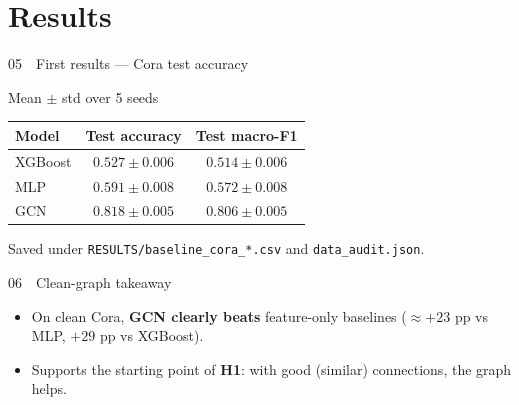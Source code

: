 \documentclass[
  english,
  aspectratio=169,
]{beamer}
\begin{document}
\section{Results}

\begin{frame}{05~~First results --- Cora test accuracy}
  \begin{block}{Mean $\pm$ std over 5 seeds}
    \renewcommand{\arraystretch}{1.25}
    \begin{tabular}{lcc}
      \textbf{Model} & \textbf{Test accuracy} & \textbf{Test macro-F1} \\
      \hline
      XGBoost & $0.527 \pm 0.006$ & $0.514 \pm 0.006$ \\
      MLP & $0.591 \pm 0.008$ & $0.572 \pm 0.008$ \\
      GCN & $\mathbf{0.818 \pm 0.005}$ & $\mathbf{0.806 \pm 0.005}$ \\
    \end{tabular}
  \end{block}

  \vspace{0.5em}
  Saved under \texttt{RESULTS/baseline\_cora\_*.csv} and \texttt{data\_audit.json}.
\end{frame}

\begin{frame}{06~~Clean-graph takeaway}
  \begin{itemize}
    \item On clean Cora, \textbf{GCN clearly beats} feature-only baselines
      ($\approx +23$ pp vs MLP, $+29$ pp vs XGBoost).
    \item Supports the starting point of \textbf{H1}: with good (similar)
      connections, the graph helps.
  \end{itemize}

  \vspace{0.4em}
  \begin{center}
  \end{center}
\end{frame}
\end{document}
